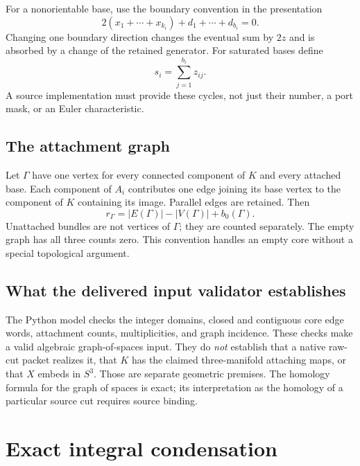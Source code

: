 \documentclass[11pt]{article}
\theoremstyle{definition}
\theoremstyle{remark}
\begin{document}
For a nonorientable base, use the boundary convention in the presentation
\begin{equation}
 2(x_1+\cdots+x_{k_i})+d_1+\cdots+d_{b_i}=0.
 \label{eq:nonorientable}
\end{equation}
Changing one boundary direction changes the eventual sum by $2z$ and is
absorbed by a change of the retained generator. For saturated bases define
\begin{equation}
 s_i=\sum_{j=1}^{b_i}z_{ij}.
 \label{eq:boundary-sum}
\end{equation}
A source implementation must provide these cycles, not just their number,
a port mask, or an Euler characteristic.

\subsection{The attachment graph}
Let $\Gamma$ have one vertex for every connected component of $K$ and every
attached base. Each component of $A_i$ contributes one edge joining its base
vertex to the component of $K$ containing its image. Parallel edges are
retained. Then
\begin{equation}
 r_\Gamma=|E(\Gamma)|-|V(\Gamma)|+b_0(\Gamma).
 \label{eq:graph}
\end{equation}
Unattached bundles are not vertices of $\Gamma$; they are counted separately.
The empty graph has all three counts zero. This convention handles an empty
core without a special topological argument.

\subsection{What the delivered input validator establishes}
The Python model checks the integer domains, closed and contiguous core edge
words, attachment counts, multiplicities, and graph incidence. These checks
make a valid algebraic graph-of-spaces input. They do \emph{not} establish
that a native raw-cut packet realizes it, that $K$ has the claimed
three-manifold attaching maps, or that $X$ embeds in $S^3$. Those are separate
geometric premises. The homology formula for the graph of spaces is exact;
its interpretation as the homology of a particular source cut requires
source binding.

\section{Exact integral condensation}
\label{sec:condensation}
\end{document}
